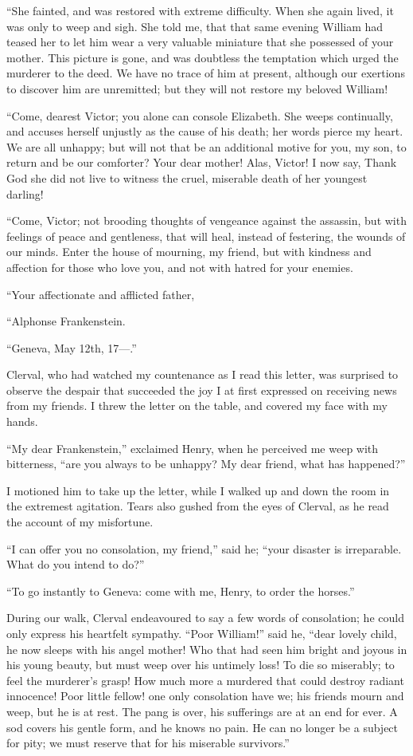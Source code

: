 \documentclass[12pt,openright]{book}
\begin{document}
“She fainted, and was restored with extreme difficulty. When she again lived, it was only to weep and sigh. She told me, that that same evening William had teased her to let him wear a very valuable miniature that she possessed of your mother. This picture is gone, and was doubtless the temptation which urged the murderer to the deed. We have no trace of him at present, although our exertions to discover him are unremitted; but they will not restore my beloved William!

“Come, dearest Victor; you alone can console Elizabeth. She weeps continually, and accuses herself unjustly as the cause of his death; her words pierce my heart. We are all unhappy; but will not that be an additional motive for you, my son, to return and be our comforter? Your dear mother! Alas, Victor! I now say, Thank God she did not live to witness the cruel, miserable death of her youngest darling!

“Come, Victor; not brooding thoughts of vengeance against the assassin, but with feelings of peace and gentleness, that will heal, instead of festering, the wounds of our minds. Enter the house of mourning, my friend, but with kindness and affection for those who love you, and not with hatred for your enemies.

“Your affectionate and afflicted father,

“Alphonse Frankenstein.

“Geneva, May 12th, 17—.”

Clerval, who had watched my countenance as I read this letter, was surprised to observe the despair that succeeded the joy I at first expressed on receiving news from my friends. I threw the letter on the table, and covered my face with my hands.

“My dear Frankenstein,” exclaimed Henry, when he perceived me weep with bitterness, “are you always to be unhappy? My dear friend, what has happened?”

I motioned him to take up the letter, while I walked up and down the room in the extremest agitation. Tears also gushed from the eyes of Clerval, as he read the account of my misfortune.

“I can offer you no consolation, my friend,” said he; “your disaster is irreparable. What do you intend to do?”

“To go instantly to Geneva: come with me, Henry, to order the horses.”

During our walk, Clerval endeavoured to say a few words of consolation; he could only express his heartfelt sympathy. “Poor William!” said he, “dear lovely child, he now sleeps with his angel mother! Who that had seen him bright and joyous in his young beauty, but must weep over his untimely loss! To die so miserably; to feel the murderer’s grasp! How much more a murdered that could destroy radiant innocence! Poor little fellow! one only consolation have we; his friends mourn and weep, but he is at rest. The pang is over, his sufferings are at an end for ever. A sod covers his gentle form, and he knows no pain. He can no longer be a subject for pity; we must reserve that for his miserable survivors.”
\end{document}
